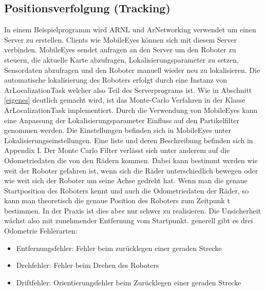 \documentclass{article}
\begin{document}
\subsection{Positionsverfolgung (Tracking)}\label{tracking}
In einem Beispielprogramm wird ARNL und ArNetworking verwendet um einen Server zu erstellen. Clients wie MobileEyes k\"onnen sich mit diesem Server verbinden. MobileEyes sendet anfragen an den Server um den Roboter zu steuern, die aktuelle Karte abzufragen, Lokalisierungsparameter zu setzen, Sensordaten abzufragen und den Roboter manuell wieder neu zu lokalisieren.
Die automatische lokalisierung des Roboters erfolgt durch eine Instanz von ArLocalizationTask welcher also Teil des Serverprograms ist. Wie in Abschnitt \ref{eigenes} deutlich gemacht wird, ist das Monte-Carlo Verfahren in der Klasse ArLocalizationTask implementiert.
Durch die Verwendung von MobileEyes kann eine Anpassung der Lokalisierungsparameter Einfluss auf den Partikelfilter genommen werden.
Die Einstellungen befinden sich in MobileEyes unter Lokalisierungseinstellungen. Eine  liste und deren Beschreibung befinden sich in Appendix I.
Der Monte Carlo Filter verl\"asst sich unter anderem auf die Odometriedaten die von den R\"adern kommen. Dabei kann bestimmt werden wie weit der Roboter gefahren ist, wenn sich die R\"ader unterschiedlich bewegen oder  wie weit sich der Roboter um seine Achse gedreht hat. Wenn man die genaue Startposition des Roboters kennt und auch die Odometriedaten der R\"ader, so kann man theoretisch die genaue Position des Roboters zum Zeitpunk t bestimmen. In der Praxis ist dies aber nur schwer zu realisieren. Die Unsicherheit
w\"achst also mit zunehmender Entfernung vom Startpunkt. generell gibt es drei Odometrie Fehlerarten:
\begin{itemize}
\item Entfernungsfehler: Fehler beim zur\"ucklegen einer geraden Strecke
\item Drehfehler: Fehler beim Drehen des Roboters
\item Driftfehler: Orientierungsfehler beim Zur\"ucklegen einer geraden Strecke
\end{itemize}
\end{document}
